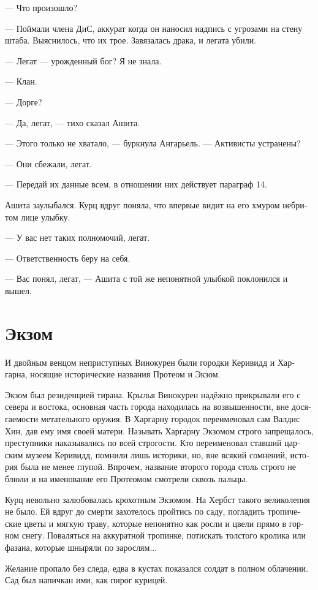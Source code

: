 \documentclass[a4paper,12pt,fleqn]{book}\usepackage{cooltooltips}\usepackage{polyglossia}\setdefaultlanguage[babelshorthands=true]{russian}\setotherlanguage{english}\defaultfontfeatures{Ligatures=TeX,Mapping=tex-text} \usepackage{xcolor}\definecolor{lightgray}{HTML}{bbbbbb}\color{lightgray}\newcommand{\ml}[3]{\textenglish{\textcolor{black}{#3}}}
\begin{document}
--- Что произошло?

--- Поймали члена ДиС, аккурат когда он наносил надпись с угрозами на стену штаба.%
Выяснилось, что их трое.
Завязалась драка, и легата убили.

--- Легат --- урожденный бог?
Я не знала.

--- Клан.

--- Дорге?

--- Да, легат, --- тихо сказал Ашита.

--- Этого только не хватало, --- буркнула Ангарьель.
--- Активисты устранены?

--- Они сбежали, легат.

--- Передай их данные всем, в отношении них действует параграф 14.

Ашита заулыбался.
Курц вдруг поняла, что впервые видит на его хмуром небритом лице улыбку.

--- У вас нет таких полномочий, легат.

--- Ответственность беру на себя.

--- Вас понял, легат, --- Ашита с той же непонятной улыбкой поклонился и вышел.

\section{Экзом}

И двойным венцом неприступных Винокурен были городки Керивидд и Харгарна, носящие исторические названия Протеом и Экзом.

Экзом был резиденцией тирана.
Крылья Винокурен надёжно прикрывали его с севера и востока, основная часть города находилась на возвышенности, вне досягаемости метательного оружия.
В Харгарну городок переименовал сам Валдис Хин, дав ему имя своей матери.
Называть Харгарну Экзомом строго запрещалось, преступники наказывались по всей строгости.
Кто переименовал ставший царским музеем Керивидд, помнили лишь историки, но, вне всякий сомнений, история была не менее глупой.
Впрочем, название второго города столь строго не блюли и на именование его Протеомом смотрели сквозь пальцы.

Курц невольно залюбовалась крохотным Экзомом.
На Хербст такого великолепия не было.
Ей вдруг до смерти захотелось пройтись по саду, погладить тропические цветы и мягкую траву, которые непонятно как росли и цвели прямо в горном снегу.
Поваляться на аккуратной тропинке, потискать толстого кролика или фазана, которые шныряли по зарослям...

Желание пропало без следа, едва в кустах показался солдат в полном облачении.
Сад был напичкан ими, как пирог курицей.
\end{document}
